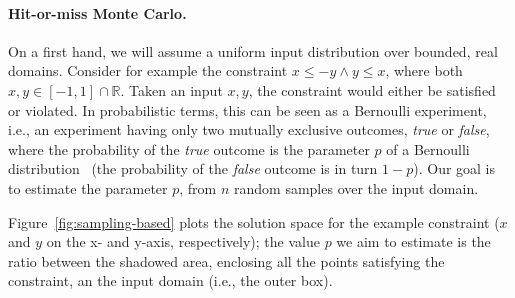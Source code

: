 \paragraph{Hit-or-miss Monte Carlo.}
On a first hand, we will assume a uniform input distribution over bounded, real domains. Consider for example the constraint $x \leq -y \land y \leq x$, where both $x, y \in [-1, 1] \cap \mathbb{R}$. Taken an input $x, y$, the constraint would either be satisfied or violated. In probabilistic terms, this can be seen as a Bernoulli experiment, i.e., an experiment having only two mutually exclusive outcomes, \textit{true} or \textit{false}, where the probability of the \textit{true} outcome is the parameter $p$ of a Bernoulli distribution~\cite{pestman1998mathematical} (the probability of the \textit{false} outcome is in turn $1-p$). Our goal is to estimate the parameter $p$, from $n$ random samples over the input domain.

Figure~\ref{fig:sampling-based} plots the solution space for the example constraint ($x$ and $y$ on the x- and y-axis, respectively); the value $p$ we aim to estimate is the ratio between the shadowed area, enclosing all the points satisfying the constraint, an the input domain (i.e., the outer box).

